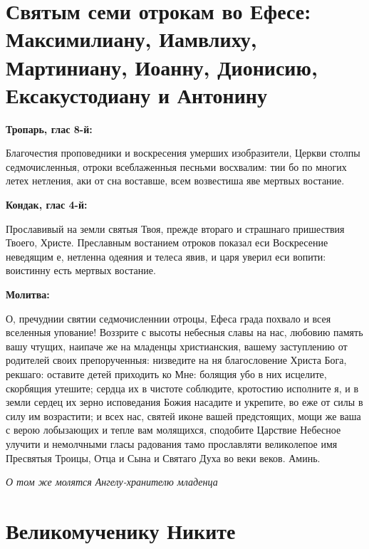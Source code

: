 
 

\section{Святым семи отрокам во Ефесе: Максимилиану, Иамвлиху, Мартиниану, Иоанну, Дионисию, Ексакустодиану и Антонину}
 
\bfseries Тропарь, глас 8-й:\normalfont{}\nopagebreak


Благочестия проповедники и воскресения умерших изобразители, Церкви столпы седмочисленныя, отроки всеблаженныя песньми восхвалим: тии бо по многих летех нетления, аки от сна воставше, всем возвестиша яве мертвых востание.


\medskip
\bfseries Кондак, глас 4-й:\normalfont{}\nopagebreak


Прославивый на земли святыя Твоя, прежде втораго и страшнаго пришествия Твоего, Христе. Преславным востанием отроков показал еси Воскресение неведящим е, нетленна одеяния и телеса явив, и царя уверил еси вопити: воистинну есть мертвых востание.


\medskip
\bfseries Молитва:\normalfont{}\nopagebreak


О, пречуднии святии седмочисленнии отроцы, Ефеса града похвало и всея вселенныя упование! Воззрите с высоты небесныя славы на нас, любовию память вашу чтущих, наипаче же на младенцы христианския, вашему заступлению от родителей своих препорученныя: низведите на ня благословение Христа Бога, рекшаго: оставите детей приходить ко Мне: болящия убо в них исцелите, скорбящия утешите; сердца их в чистоте соблюдите, кротостию исполните я, и в земли сердец их зерно исповедания Божия насадите и укрепите, во еже от силы в силу им возрастити; и всех нас, святей иконе вашей предстоящих, мощи же ваша с верою лобызающих и тепле вам молящихся, сподобите Царствие Небесное улучити и немолчными гласы радования тамо прославляти великолепое имя Пресвятыя Троицы, Отца и Сына и Святаго Духа во веки веков. Аминь.

\itshape О том же молятся Ангелу-хранителю младенца\normalfont{} 

\mychapterending


 

\section{Великомученику Никите}
 
